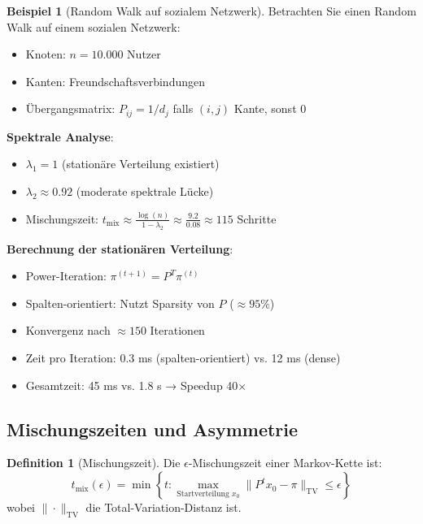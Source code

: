 \documentclass[a4paper,12pt]{report}
\theoremstyle{definition}
\newtheorem{definition}{Definition}
\newtheorem{beispiel}{Beispiel}
\begin{document}
	\begin{beispiel}[Random Walk auf sozialem Netzwerk]
		Betrachten Sie einen Random Walk auf einem sozialen Netzwerk:
		\begin{itemize}
			\item Knoten: $n = 10.000$ Nutzer
			\item Kanten: Freundschaftsverbindungen
			\item Übergangsmatrix: $P_{ij} = 1/d_j$ falls $(i,j)$ Kante, sonst 0
		\end{itemize}
		
		\textbf{Spektrale Analyse}:
		\begin{itemize}
			\item $\lambda_1 = 1$ (stationäre Verteilung existiert)
			\item $\lambda_2 \approx 0.92$ (moderate spektrale Lücke)
			\item Mischungszeit: $t_{\text{mix}} \approx \frac{\log(n)}{1 - \lambda_2} \approx \frac{9.2}{0.08} \approx 115$ Schritte
		\end{itemize}
		
		\textbf{Berechnung der stationären Verteilung}:
		\begin{itemize}
			\item Power-Iteration: $\pi^{(t+1)} = P^T \pi^{(t)}$
			\item Spalten-orientiert: Nutzt Sparsity von $P$ ($\approx 95\%$)
			\item Konvergenz nach $\approx 150$ Iterationen
			\item Zeit pro Iteration: 0.3 ms (spalten-orientiert) vs. 12 ms (dense)
			\item Gesamtzeit: 45 ms vs. 1.8 s → Speedup 40$\times$
		\end{itemize}
	\end{beispiel}
	
	\subsection{Mischungszeiten und Asymmetrie}
	
	\begin{definition}[Mischungszeit]
		Die $\epsilon$-Mischungszeit einer Markov-Kette ist:
		\[
		t_{\text{mix}}(\epsilon) = \min \left\{ t : \max_{\text{Startverteilung } x_0} \|P^t x_0 - \pi\|_{\text{TV}} \leq \epsilon \right\}
		\]
		wobei $\|\cdot\|_{\text{TV}}$ die Total-Variation-Distanz ist.
	\end{definition}
	
\end{document}

